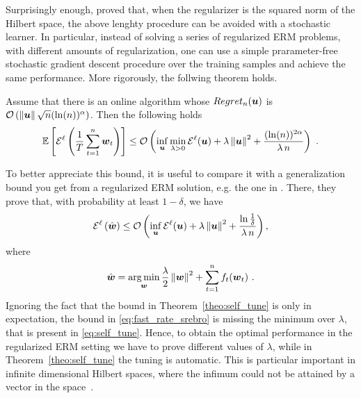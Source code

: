 Surprisingly enough, \citep{Orabona14} proved that, when the regularizer is the squared norm of the Hilbert space, the above lenghty procedure can be avoided with a stochastic learner.
In particular, instead of solving a series of regularized ERM problems, with different amounts of regularization, one can use a simple prarameter-free stochastic gradient descent procedure over the training samples and achieve the same performance.
More rigorously, the follwing theorem holds.
\begin{theorem}
\label{theo:self_tune}
Assume that there is an online algorithm whose $Regret_n(\boldsymbol{u})$ is $\mathcal{O}\left(\left\|{\boldsymbol{u}}\right\|\sqrt{n} (\ln(n))^\alpha\right)$. Then the following holds
\begin{equation}
\label{eq:self_tune}
\mathbb{E}\left[\mathcal{E}^{\ell}\left(\frac{1}{T} \sum_{t=1}^n \boldsymbol{w}_t\right)\right] \leq \mathcal{O}\left(\inf_{\boldsymbol{u}} \min_{\lambda>0} \mathcal{E}^{\ell}(\boldsymbol{u}) + \lambda \left\|{\boldsymbol{u}}\right\|^2 +\frac{(\ln(n))^{2 \alpha}}{\lambda \, n} \right)~.
\end{equation}
\end{theorem}
To better appreciate this bound, it is useful to compare it with a generalization bound you get from a regularized \ac{ERM} solution, e.g. the one in \citet{SridharanSSS09}.
There, they prove that, with probability at least $1-\delta$, we have
\begin{equation}
\label{eq:fast_rate_srebro}
\mathcal{E}^{\ell}\left(\hat{\boldsymbol{w}}\right) \leq \mathcal{O}\left(\inf_{\boldsymbol{u}} \mathcal{E}^{\ell}(\boldsymbol{u}) + \lambda \left\|{\boldsymbol{u}}\right\|^2 +\frac{\ln \frac{1}{\delta}}{\lambda \, n} \right),
\end{equation}
where 
\begin{align*}
\hat{\boldsymbol{w}}=\operatorname*{arg\,min}_{\boldsymbol{w}} \frac{\lambda}{2}\left\|{\boldsymbol{w}}\right\|^2 + \sum_{t=1}^n f_t(\boldsymbol{w}_t)~.
\end{align*}
Ignoring the fact that the bound in Theorem~\ref{theo:self_tune} is only in expectation, the bound in \eqref{eq:fast_rate_srebro} is missing the minimum over $\lambda$, that is present in \eqref{eq:self_tune}. Hence, to obtain the optimal performance in the regularized \ac{ERM} setting we have to prove different values of $\lambda$, while in Theorem~\ref{theo:self_tune} the tuning is automatic. This is particular important in infinite dimensional Hilbert spaces, where the infimum could not be attained by a vector in the space~\cite{Orabona14}.

